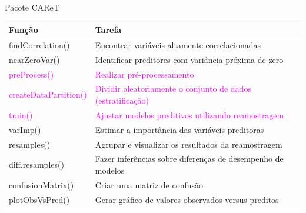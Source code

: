 \documentclass[12pt,ignorenonframetext,aspectratio=1610]{beamer}
\begin{document}
\transwipe
\begin{frame}[t]{Pacote CAReT}
	\centering
		\begin{tabular}{@{}ll@{}}
			\toprule
			\rowcolor{LightCyan}
			\textbf{Função}                     & \textbf{Tarefa}  \\ \midrule
			\rowcolor{LightCyan}
			findCorrelation()      & Encontrar variáveis altamente correlacionadas \\
			\rowcolor{LightCyan}
			nearZeroVar()          & Identificar preditores com variância próxima de zero \\
			\rowcolor{LightCyan}
			\textcolor{magenta}{preProcess()}           & \textcolor{magenta}{Realizar pré-processamento} \\
			\rowcolor{LightCyan}
			\textcolor{magenta}{createDataPartition()}  & \textcolor{magenta}{Dividir aleatoriamente o conjunto de dados (estratificação)} \\
			\rowcolor{LightCyan}
			\textcolor{magenta}{train()}                & \textcolor{magenta}{Ajustar modelos preditivos utilizando reamostragem} \\ 
			\rowcolor{LightCyan}
			varImp()               & Estimar a importância das variáveis preditoras \\
			\rowcolor{LightCyan}
			resamples()            & Agrupar e visualizar os resultados da reamostragem \\
			\rowcolor{LightCyan}
			diff.resamples()       & Fazer inferências sobre diferenças de desempenho de modelos \\
			\rowcolor{LightCyan}
			confusionMatrix()     & Criar uma matriz de confusão \\
			\rowcolor{LightCyan}
			plotObsVsPred()       & Gerar gráfico de valores observados versus preditos \\ \bottomrule
		\end{tabular}
\end{frame}
\end{document}
